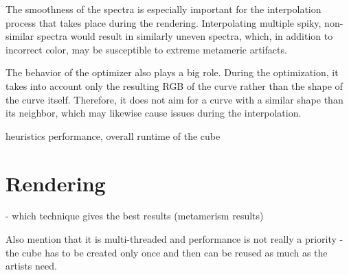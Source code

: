 The smoothness of the spectra is especially important for the interpolation process that takes place during the rendering. Interpolating multiple spiky, non-similar spectra would result in similarly uneven spectra, which, in addition to incorrect color, may be susceptible to extreme metameric artifacts.  

The behavior of the optimizer also plays a big role. During the optimization, it takes into account only the resulting RGB of the curve rather than the shape of the curve itself. Therefore, it does not aim for a curve with a similar shape than its neighbor, which may likewise cause issues during the interpolation.


heuristics performance, overall runtime of the cube

\section{Rendering}

- which technique gives the best results (metamerism results)


Also mention that it is multi-threaded and performance is not really a priority - the cube has to be created only once and then can be reused as much as the artists need.
